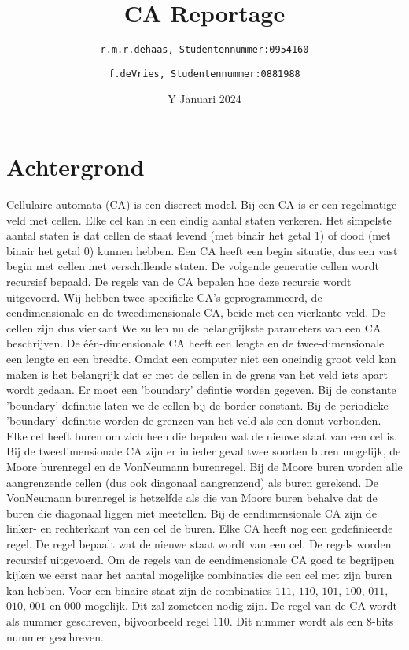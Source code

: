 \documentclass[12pt,a4paper]{article}
\title{CA Reportage}
\author{
\texttt{r.m.r.dehaas, \hspace{6pt} 
Studentennummer:\hspace{2pt}0954160}
\and
\texttt{f.deVries, \hspace{6pt}
Studentennummer:\hspace{2pt}0881988}}
\date{Y Januari 2024}
\begin{document}
\maketitle
\section*{Achtergrond}
Cellulaire automata (CA) is een discreet model. 
Bij een CA is er een regelmatige veld met cellen. 
Elke cel kan in een eindig aantal staten verkeren.
Het simpelste aantal staten is dat cellen 
de staat levend (met binair het getal 1) of dood (met binair het getal 0) kunnen hebben.
Een CA heeft een begin situatie, dus een vast begin met cellen met verschillende staten.
De volgende generatie cellen wordt recursief bepaald. 
De regels van de CA bepalen hoe deze recursie wordt uitgevoerd.
Wij hebben twee specifieke CA's geprogrammeerd, de eendimensionale en de
tweedimensionale CA, beide met een vierkante veld. 
De cellen zijn dus vierkant  
We zullen nu de belangrijkste parameters van een CA beschrijven.
De één-dimensionale CA heeft een lengte en de twee-dimensionale een lengte en een breedte.
Omdat een computer niet een oneindig groot veld kan maken is het belangrijk dat 
er met de cellen in de grens van het veld iets apart wordt gedaan. Er moet een 'boundary' defintie worden gegeven.
Bij de constante 'boundary' definitie laten we de cellen bij de border constant.
Bij de periodieke 'boundary' definitie worden de grenzen van het veld als een donut verbonden.
Elke cel heeft buren om zich heen die bepalen wat de nieuwe staat van een cel is.
Bij de tweedimensionale CA zijn er in ieder geval twee soorten buren mogelijk, de Moore burenregel en de VonNeumann burenregel.
Bij de Moore buren worden alle aangrenzende cellen (dus ook diagonaal aangrenzend) als buren gerekend.
De VonNeumann burenregel is hetzelfde als die van Moore buren behalve dat de buren die diagonaal liggen niet meetellen.
Bij de eendimensionale CA zijn de linker- en rechterkant van een cel de buren.
Elke CA heeft nog een gedefinieerde regel. De regel bepaalt wat de nieuwe staat wordt van een cel.
De regels worden recursief uitgevoerd.
Om de regels van de eendimensionale CA goed te begrijpen kijken we eerst naar het aantal mogelijke combinaties die een cel met zijn buren kan hebben.
Voor een binaire staat zijn de combinaties $111$, $110$, $101$, $100$, $011$, $010$, $001$ en $000$ mogelijk.
Dit zal zometeen nodig zijn.
De regel van de CA wordt als nummer geschreven, bijvoorbeeld regel $110$.
Dit nummer wordt als een 8-bits nummer geschreven. 
\end{document}
